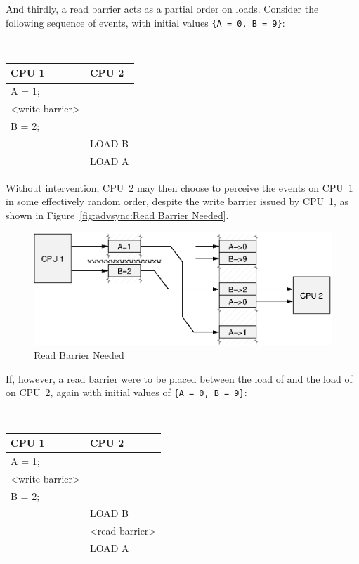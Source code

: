 And thirdly, a read barrier acts as a partial order on loads.  Consider the
following sequence of events, with initial values
{\tt \{A = 0, B = 9\}}:

\vspace{5pt}
\begin{minipage}[t]{\columnwidth}
\tt
\scriptsize
\begin{tabular}{l|p{1.5in}}
	CPU 1 &		CPU 2 \\
	\hline
	A = 1; & \\
	<write barrier> & \\
	B = 2; & \\
		&	LOAD B \\
		&	LOAD A \\
\end{tabular}
\end{minipage}
\vspace{5pt}

Without intervention, CPU~2 may then choose to perceive the events on CPU~1 in
some effectively random order, despite the write barrier issued by CPU~1, as
shown in Figure~\ref{fig:advsync:Read Barrier Needed}.

\begin{figure}[htb]
\centering
\includegraphics{advsync/ReadBarrierNeeded}
\caption{Read Barrier Needed}
\end{figure}

If, however, a read barrier were to be placed between the load of 
and the load of  on CPU~2, again with initial values of
{\tt \{A = 0, B = 9\}}:

\vspace{5pt}
\begin{minipage}[t]{\columnwidth}
\tt
\scriptsize
\begin{tabular}{l|p{1.5in}}
	CPU 1 &		CPU 2 \\
	\hline
	A = 1; & \\
	<write barrier> & \\
	B = 2; & \\
		&	LOAD B \\
		&	<read barrier> \\
		&	LOAD A \\
\end{tabular}
\end{minipage}
\vspace{5pt}

